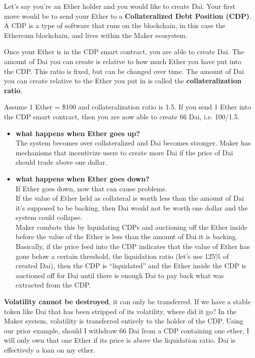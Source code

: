 Let's say you're an Ether holder and you would like to create Dai. Your first move would be to send your Ether to a \textbf{Collateralized Debt Position (CDP)}. A CDP is a type of software that runs on the blockchain, in this case the Ethereum blockchain, and lives within the Maker ecosystem.

Once your Ether is in the CDP smart contract, you are able to create Dai. The amount of Dai you can create is relative to how much Ether you have put into the CDP. This ratio is fixed, but can be changed over time. The amount of Dai you can create relative to the Ether you put in is called the \textbf{collateralization ratio}.

Assume 1 Ether = \$100 and collateralization ratio is 1.5. If you send 1 Ether into the CDP smart contract, then you are now able to create 66 Dai, i.e. 100/1.5.

\begin{itemize}
	\item \textbf{what happens when Ether goes up?}\\
	The system becomes over collateralized and Dai becomes stronger.
	Maker has mechanisms that incentivize users to create more Dai if the price of Dai should trade above one dollar.
	\item \textbf{what happens when Ether goes down?}\\
	If Ether goes down, now that can cause problems.\\
	If the value of Ether held as collateral is worth less than the amount of Dai it's supposed to be backing, then Dai would not be worth one dollar and the system could collapse.\\
	Maker combats this by liquidating CDPs and auctioning off the Ether inside before the value of the Ether is less than the amount of Dai it is backing.\\
	Basically, if the price feed into the CDP indicates that the value of Ether has gone below a certain threshold, the liquidation ratio (let's use 125\% of created Dai), then the CDP is ``liquidated'' and the Ether inside the CDP is auctioned off for Dai until there is enough Dai to pay back what was extracted from the CDP.
\end{itemize}

\textbf{Volatility cannot be destroyed}, it can only be transferred. If we have a stable token like Dai that has been stripped of its volatility, where did it go? In the Maker system, volatility is transferred entirely to the holder of the CDP. Using our prior example, should I withdraw 66 Dai from a CDP containing one ether, I will only own that one Ether if its price is above the liquidation ratio. Dai is effectively a loan on my ether.

